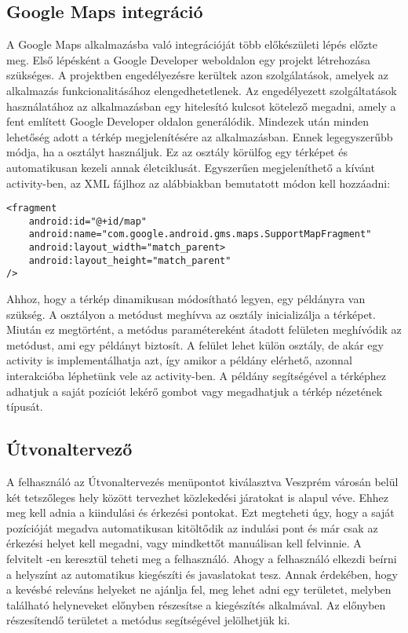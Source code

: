\subsection*{Google Maps integráció}
\label{googlemaps}
A Google Maps alkalmazásba való integrációját több előkészületi lépés előzte meg.
Első lépésként a Google Developer weboldalon egy projekt létrehozása szükséges.
A projektben engedélyezésre kerültek azon szolgálatások, amelyek az alkalmazás funkcionalitásához elengedhetetlenek.
Az engedélyezett szolgáltatások használatához az alkalmazásban egy hitelesító kulcsot kötelező megadni, amely a fent említett Google Developer oldalon generálódik. 
Mindezek után minden lehetőség adott a térkép megjelenítésére az alkalmazásban.
Ennek legegyszerűbb módja, ha a  osztályt használjuk.
Ez az osztály körülfog egy térképet és automatikusan kezeli annak életciklusát.
Egyszerűen megjeleníthető a kívánt activity-ben, az XML fájlhoz az alábbiakban bemutatott módon kell hozzáadni:
\begin{lstlisting}
<fragment
	android:id="@+id/map"
	android:name="com.google.android.gms.maps.SupportMapFragment"
	android:layout_width="match_parent>
	android:layout_height="match_parent"
/>
\end{lstlisting}

Ahhoz, hogy a térkép dinamikusan módosítható legyen, egy  példányra van szükség.
A  osztályon a  metódust meghívva az osztály inicializálja a térképet.
Miután ez megtörtént, a metódus paramétereként átadott  felületen meghívódik az  metódust, ami egy  példányt biztosít.
A  felület lehet külön osztály, de akár egy activity is implementálhatja azt, így amikor a példány elérhető, azonnal interakcióba léphetünk vele az activity-ben.
A  példány segítségével a térképhez adhatjuk a saját pozíciót lekérő gombot vagy megadhatjuk a térkép nézetének típusát.

\subsection*{Útvonaltervező}
\label{planner}
A felhasználó az Útvonaltervezés menüpontot kiválasztva Veszprém városán belül két tetszőleges hely között tervezhet közlekedési járatokat is alapul véve.
Ehhez meg kell adnia a kiindulási és érkezési pontokat.
Ezt megteheti úgy, hogy a saját pozícióját megadva automatikusan kitöltődik az indulási pont és már csak az érkezési helyet kell megadni, vagy mindkettőt manuálisan kell felvinnie.
A felvitelt -en keresztül teheti meg a felhasználó.
Ahogy a felhasználó elkezdi beírni a helyszínt az  automatikus kiegészíti és javaslatokat tesz.
Annak érdekében, hogy a kevésbé releváns helyeket ne ajánlja fel, meg lehet adni egy területet, melyben található helyneveket előnyben részesítse a kiegészítés alkalmával.
Az előnyben részesítendő területet a  metódus segítségével jelölhetjük ki.

